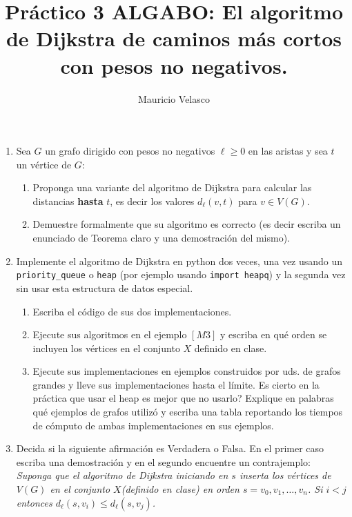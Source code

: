\documentclass[12pt, a4paper]{article}
\date{}
\begin{document}
\title{Pr\'actico 3 ALGABO: El algoritmo de Dijkstra de caminos m\'as cortos con pesos no negativos.}
\author{Mauricio Velasco}
\maketitle{}



\begin{enumerate} 

\item Sea $G$ un grafo dirigido con pesos no negativos $\ell\geq 0$ en las aristas y sea $t$ un v\'ertice de $G$:
\begin{enumerate}
\item  Proponga una variante del algoritmo de Dijkstra para calcular las distancias {\bf hasta } $t$, es decir los valores $d_{\ell}(v,t)$ para $v\in V(G)$. 
\item Demuestre formalmente que su algoritmo es correcto (es decir escriba un enunciado de Teorema claro y una demostración del mismo).
\end{enumerate}

\item Implemente el algoritmo de Dijkstra en python dos veces, una vez usando un \verb!priority_queue! o \verb!heap! (por ejemplo usando \verb!import heapq!) y la segunda vez sin usar esta estructura de datos especial.
\begin{enumerate}
\item Escriba el c\'odigo de sus dos implementaciones.
\item Ejecute sus algoritmos en el ejemplo $[M3]$ y escriba en qu\'e orden se incluyen los v\'ertices en el conjunto $X$ definido en clase.
\item Ejecute sus implementaciones en ejemplos construidos por uds. de grafos grandes y lleve sus implementaciones hasta el l\'imite. Es cierto en la pr\'actica que usar el heap es mejor que no usarlo? Explique en palabras qu\'e ejemplos de grafos utiliz\'o y escriba una tabla reportando los tiempos de cómputo de ambas implementaciones en sus ejemplos.
\end{enumerate}

\item Decida si la siguiente afirmación es Verdadera o Falsa. En el primer caso escriba una demostraci\'on y en el segundo encuentre un contrajemplo: {\it Suponga que el algoritmo de Dijkstra iniciando en $s$ inserta los v\'ertices de $V(G)$ en el conjunto $X$(definido en clase) en orden  $s=v_0,v_1,\dots, v_n$. Si $i<j$ entonces $d_{\ell}(s,v_i)\leq d_{\ell}(s,v_j)$.}



\end{enumerate}
\end{document}
